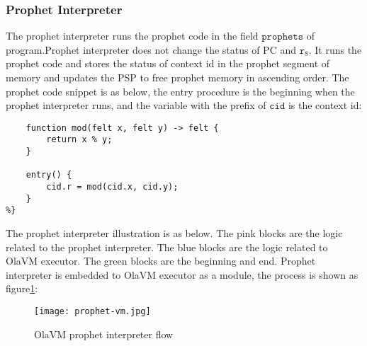 \subsubsection{Prophet Interpreter}\label{subsec: prophet-interpreter}
The prophet interpreter runs the prophet code in the field $\texttt{prophets}$ of program.Prophet interpreter does not change the status of PC and $\texttt{r}_{8}$.
It runs the prophet code and stores the status of context id in the prophet segment of memory and updates the PSP to free prophet memory in ascending order.
The prophet code snippet is as below, the entry procedure is the beginning when the prophet interpreter runs, and the variable with the prefix of $\texttt{cid}$ is the context id:
\begin{lstlisting}[label={lst:prophet-demo}]
%{
    function mod(felt x, felt y) -> felt {
        return x % y;
    }

    entry() {
        cid.r = mod(cid.x, cid.y);
    }
%}
\end{lstlisting}

The prophet interpreter illustration is as below.
The pink blocks are the logic related to the prophet interpreter.
The blue blocks are the logic related to OlaVM executor.
The green blocks are the beginning and end.
Prophet interpreter is embedded to OlaVM executor as a module, the process is shown as figure\ref{fig: prophet-interpreter-logic}:
\begin{figure}[!htp]
    \centering
    \texttt{[image: prophet-vm.jpg]}
    \caption{OlaVM prophet interpreter flow}
    \label{fig: prophet-interpreter-logic}
\end{figure}
